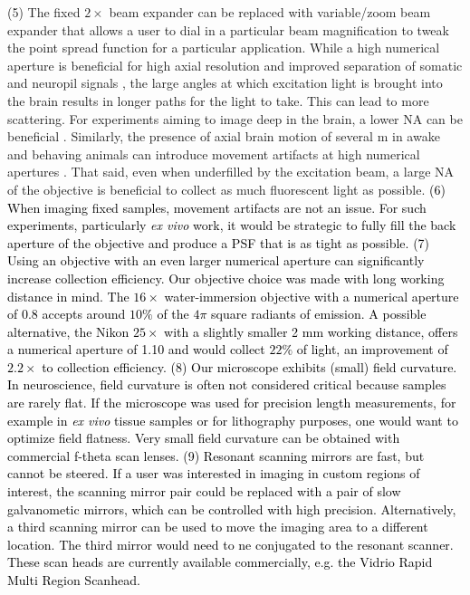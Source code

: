 \documentclass[10pt,letterpaper]{article}
\begin{document}
(5) The fixed $2\times$ beam expander can be replaced with variable/zoom beam expander that allows a user to dial in a particular beam magnification to tweak the point spread function for a particular application\cite{Smith2019}. While a high numerical aperture is beneficial for high axial resolution and improved separation of somatic and neuropil signals \cite{Kerr2008, Gobel2007}, the large angles at which excitation light is brought into the brain results in longer paths for the light to take. This can lead to more scattering. For experiments aiming to image deep in the brain, a lower NA can be beneficial \cite{Tung2004}. Similarly, the presence of axial brain motion of several \textmu m in awake and behaving animals can introduce movement artifacts at high numerical apertures \cite{Dombeck2007}. That said, even when underfilled by the excitation beam, a large NA of the objective is beneficial to collect as much fluorescent light as possible.\newline
\textcolor{black}{(6) When imaging fixed samples, movement artifacts are not an issue. For such experiments, particularly \textit{ex vivo} work, it would be strategic to fully fill the back aperture of the objective and produce a PSF that is as tight as possible.}\newline
\textcolor{black}{(7) Using an objective with an even larger numerical aperture can significantly increase collection efficiency. Our objective choice was made with long working distance in mind. The $16\times$ water-immersion objective with a numerical aperture of 0.8 accepts around $10\%$ of the $4\pi$ square radiants of emission. A possible alternative, the Nikon $25\times$ with a slightly smaller 2 mm working distance, offers a numerical aperture of 1.10 and would collect $22\%$ of light, an improvement of $2.2\times$ to collection efficiency.}\newline
\textcolor{black}{(8) Our microscope exhibits (small) field curvature. In neuroscience, field curvature is often not considered critical because samples are rarely flat. If the microscope was used for precision length measurements, for example in \textit{ex vivo} tissue samples or for lithography purposes, one would want to optimize field flatness. Very small field curvature can be obtained with commercial f-theta scan lenses.}\newline
\textcolor{black}{(9) Resonant scanning mirrors are fast, but cannot be steered. If a user was interested in imaging in custom regions of interest, the scanning mirror pair could be replaced with a pair of slow galvanometic mirrors, which can be controlled with high precision. Alternatively, a third scanning mirror can be used to move the imaging area to a different location. The third mirror would need to ne conjugated to the resonant scanner. These scan heads are currently available commercially, e.g. the Vidrio Rapid Multi Region Scanhead.}\newline
\end{document}
